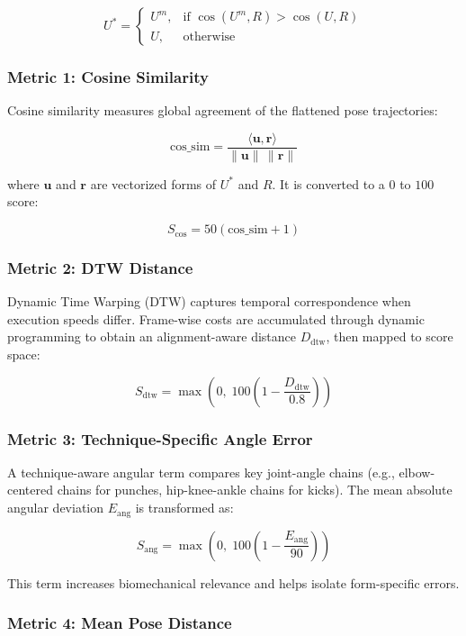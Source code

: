 \documentclass[12pt]{article}
\begin{document}
{\[
U^{*}=
\begin{cases}
U^{m}, & \text{if } \cos(U^{m},R) > \cos(U,R) \\
U, & \text{otherwise}
\end{cases}
\]

\subsubsection{Metric 1: Cosine Similarity}

Cosine similarity measures global agreement of the flattened pose trajectories:

\[
\text{cos\_sim}=\frac{\langle \mathbf{u},\mathbf{r}\rangle}{\|\mathbf{u}\|\,\|\mathbf{r}\|}
\]

where \(\mathbf{u}\) and \(\mathbf{r}\) are vectorized forms of \(U^{*}\) and \(R\). It is converted to a \(0\) to \(100\) score:

\[
S_{\text{cos}} = 50(\text{cos\_sim}+1)
\]

\subsubsection{Metric 2: DTW Distance}

Dynamic Time Warping (DTW) captures temporal correspondence when execution speeds differ. Frame-wise costs are accumulated through dynamic programming to obtain an alignment-aware distance \(D_{\text{dtw}}\), then mapped to score space:

\[
S_{\text{dtw}} = \max\left(0,\;100\left(1-\frac{D_{\text{dtw}}}{0.8}\right)\right)
\]

\subsubsection{Metric 3: Technique-Specific Angle Error}

A technique-aware angular term compares key joint-angle chains (e.g., elbow-centered chains for punches, hip-knee-ankle chains for kicks). The mean absolute angular deviation \(E_{\text{ang}}\) is transformed as:

\[
S_{\text{ang}} = \max\left(0,\;100\left(1-\frac{E_{\text{ang}}}{90}\right)\right)
\]

This term increases biomechanical relevance and helps isolate form-specific errors.

\subsubsection{Metric 4: Mean Pose Distance}

}
\end{document}
